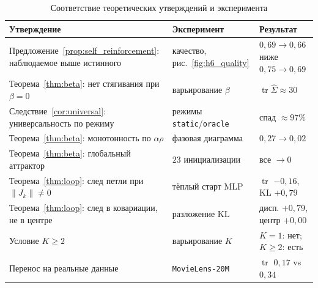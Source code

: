 \begin{table}[H]
    \caption{Соответствие теоретических утверждений и эксперимента}
    \label{tab:theory_exp}
    \centering
    \begin{tabular}{p{6.2cm}p{3.2cm}p{4.2cm}}
        \toprule
        Утверждение & Эксперимент & Результат \\
        \midrule
        Предложение~\ref{prop:self_reinforcement}: наблюдаемое выше истинного &
        качество, рис.~\ref{fig:h6_quality} & $0{,}69\!\to\!0{,}66$ ниже
        $0{,}75\!\to\!0{,}69$ \\
        Теорема~\ref{thm:beta}: нет стягивания при $\beta=0$ &
        варьирование $\beta$ & $\operatorname{tr}\hat\Sigma\approx30$ \\
        Следствие~\ref{cor:universal}: универсальность по режиму &
        режимы \texttt{static}/\texttt{oracle} & спад $\approx97\%$ \\
        Теорема~\ref{thm:beta}: монотонность по $\alpha\rho$ &
        фазовая диаграмма & $0{,}27\to0{,}02$ \\
        Теорема~\ref{thm:beta}: глобальный аттрактор &
        $23$ инициализации & все $\to0$ \\
        Теорема~\ref{thm:loop}: след петли при $\lVert J_k\rVert\neq0$ &
        тёплый старт MLP & $\operatorname{tr}$ $-0{,}16$, $\mathrm{KL}$ $+0{,}79$ \\
        Теорема~\ref{thm:loop}: след в ковариации, не в центре &
        разложение $\mathrm{KL}$ & дисп. $+0{,}79$, центр $+0{,}00$ \\
        Условие $K\ge2$ & варьирование $K$ & $K{=}1$: нет; $K\ge2$: есть \\
        Перенос на реальные данные & \texttt{MovieLens-20M} &
        $\operatorname{tr}$ $0{,}17$ vs $0{,}34$ \\
        \bottomrule
    \end{tabular}
\end{table}
